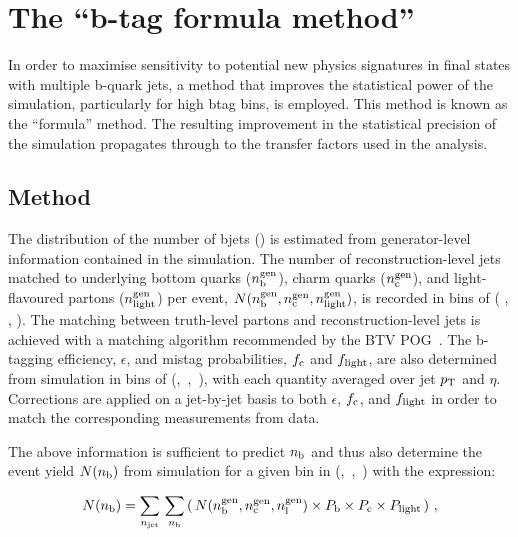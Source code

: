 \section{The ``b-tag formula method''\label{sec:bjets}}

In order to maximise sensitivity to potential new physics signatures
in final states with multiple b-quark jets, a method that improves the
statistical power of the simulation, particularly for high btag bins, is
employed. This method is known as the ``formula'' method. The
resulting improvement in the statistical precision of the simulation
propagates through to the transfer factors used in the analysis.

\subsection{Method}

The distribution of the number of bjets (\nb) is estimated from generator-level information
contained in the simulation. The number of reconstruction-level jets
matched to underlying bottom quarks ($n_{\text{b}}^{\rm gen}$), charm quarks
($n_{\rm c}^{\rm gen}$), and light-flavoured partons ($n_{\rm
  light}^{\rm gen}$) per event, $N(n_{\text{b}}^{\rm gen},n_{\rm c}^{\rm
  gen},n_{\rm light}^{\rm gen})$, is recorded in bins of (\njet
   , \scalht, \mht). 
 The matching between truth-level partons
and reconstruction-level jets is achieved with a matching algorithm
recommended by the BTV POG~\cite{btagMCTools}.
 The b-tagging efficiency, $\epsilon$, and mistag probabilities,
$f_{\rm c}$ and $f_{\rm light}$, are also determined from simulation
in bins of (\njet,~\scalht,~\mht), with each quantity averaged
over jet $p_{\rm T}$ and $\eta$. Corrections are applied on a
jet-by-jet basis to both $\epsilon$, $f_{\rm c}$, and $f_{\rm light}$
in order to match the corresponding measurements from
data.

The above information is sufficient to predict $n_{\text{b}}$ and thus also
determine the event yield $N(n_{\rm b})$ from simulation for a given
bin in (\njet,~\scalht,~\mht) with the expression:

\begin{equation}
  \label{equ:btag-formula}
  N(n_{\textrm{b}}) = \sum_{n_{\textrm{jet}}} \, \sum_{n_{\textrm{b}}}
  \left( \, N(n_{\textrm{b}}^{\textrm{gen}},
    n_{\textrm{c}}^{\textrm{gen}}, n_{\textrm{l}}^{\textrm{gen}})
    \times P_{\rm b} \times P_{\rm c} \times P_{\rm light} \, \right) \, , 
\end{equation}

